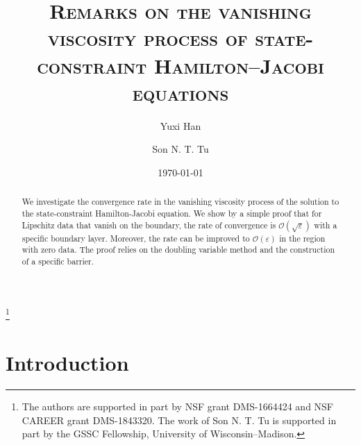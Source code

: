 \documentclass[12pt,reqno]{amsart}
\numberwithin{figure}{section}
\theoremstyle{plain}
\theoremstyle{remark}
\numberwithin{equation}{section}
\begin{document}
\title[Rate of convergence]
{\textsc{Remarks on the vanishing viscosity process of state-constraint Hamilton--Jacobi equations}}
\thanks{The authors are supported in part by NSF grant DMS-1664424 and NSF CAREER grant DMS-1843320. The work of Son N. T. Tu is supported in part by the GSSC Fellowship, University of Wisconsin--Madison.}
\begin{abstract}
We investigate the convergence rate in the vanishing viscosity process of  the solution to the state-constraint Hamilton-Jacobi equation. We show by a simple proof that for Lipschitz data that vanish on the boundary, the rate of convergence is $\mathcal{O}(\sqrt{\varepsilon})$ with a specific boundary layer. Moreover, the rate can be improved to $\mathcal{O}(\varepsilon)$ in the region with zero data. The proof relies on the doubling variable method and the construction of a specific barrier.
\end{abstract}
\author{Yuxi Han}
\address[Y. Han]
{
Department of Mathematics, 
University of Wisconsin Madison, 480 Lincoln  Drive, Madison, WI 53706, USA}
\author{Son N. T. Tu}
\address[S. N.T. Tu]
{
Department of Mathematics, 
University of Wisconsin Madison, 480 Lincoln  Drive, Madison, WI 53706, USA}
\date{\today}
\maketitle
\setcounter{tocdepth}{1}

\section{Introduction}\label{sec:intro}
\end{document}
